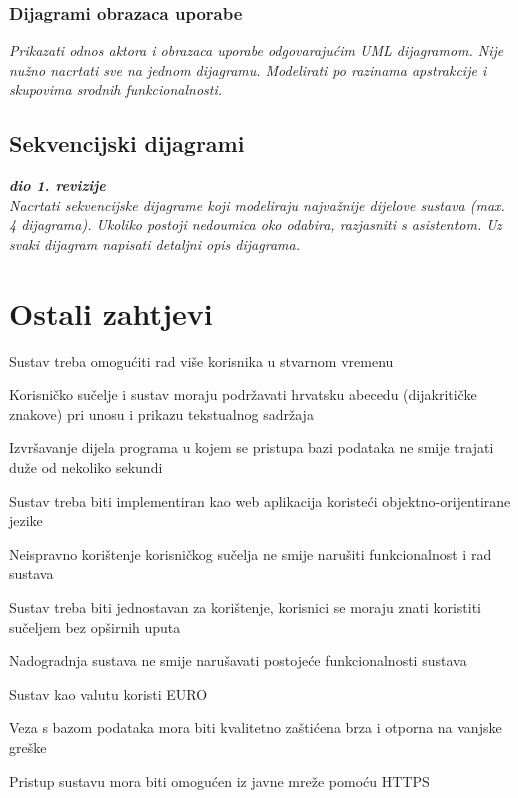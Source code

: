 				\subsubsection{Dijagrami obrazaca uporabe}
					
					\textit{Prikazati odnos aktora i obrazaca uporabe odgovarajućim UML dijagramom. Nije nužno nacrtati sve na jednom dijagramu. Modelirati po razinama apstrakcije i skupovima srodnih funkcionalnosti.}
				\eject		
				
			\subsection{Sekvencijski dijagrami}
				
				\textbf{\textit{dio 1. revizije}}\\
				
				\textit{Nacrtati sekvencijske dijagrame koji modeliraju najvažnije dijelove sustava (max. 4 dijagrama). Ukoliko postoji nedoumica oko odabira, razjasniti s asistentom. Uz svaki dijagram napisati detaljni opis dijagrama.}
				\eject
	
		\section{Ostali zahtjevi}
		
			\item Sustav treba omogućiti rad više korisnika u stvarnom vremenu
			\item Korisničko sučelje i sustav moraju podržavati hrvatsku abecedu (dijakritičke znakove) pri unosu i prikazu tekstualnog sadržaja
			\item Izvršavanje dijela programa u kojem se pristupa bazi podataka ne smije trajati duže od nekoliko sekundi
			\item Sustav treba biti implementiran kao web aplikacija koristeći objektno-orijentirane jezike
			\item Neispravno korištenje korisničkog sučelja ne smije narušiti funkcionalnost i rad sustava
			\item Sustav treba biti jednostavan za korištenje, korisnici se moraju znati koristiti sučeljem bez opširnih uputa
			\item Nadogradnja sustava ne smije narušavati postojeće funkcionalnosti sustava
			\item Sustav kao valutu koristi EURO
			\item Veza s bazom podataka mora biti kvalitetno zaštićena brza i otporna na vanjske greške
			\item Pristup sustavu mora biti omogućen iz javne mreže pomoću HTTPS